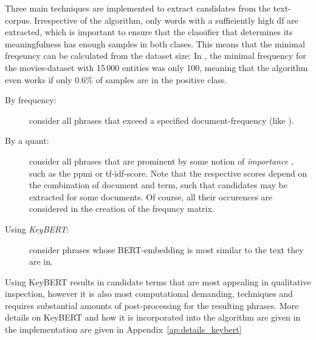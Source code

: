 Three main techniques are implemented to extract candidates from the text-corpus. Irrespective of the algorithm, only words with a sufficiently high \gls{df} are extracted, which is important to ensure that the classifier that determines its meaningfulness has enough samples in both clases. This means that the minimal freqeuncy can be calculated from the dataset size: In \cite{Derrac2015}, the minimal frequency for the movies-dataset with 15\,000 entities was only 100, meaning that the algorithm even works if only 0.6\% of samples are in the positive class. 


\begin{description}
	\item[By frequency:] consider all phrases that exceed a specified document-frequency (like \cite{Derrac2015}).
	\item[By a \gls{quant}:] consider all phrases that are prominent by some notion of \textit{importance} , such as the \gls{ppmi} or \gls{tf-idf}-score. Note that the respective scores depend on the combination of document and term, such that candidates may be extracted for some documents. Of course, all their occurences are considered in the creation of the frequncy matrix.
	\item[Using \emph{KeyBERT}\cite{grootendorst2020keybert}:] consider phrases whose BERT-embedding \cite{Devlin2019} is most similar to the text they are in. 
\end{description}

Using KeyBERT results in candidate terms that are most appealing in qualitative inspection, however it is also most computational demanding, techniques and requires substantial amounts of post-processing for the resulting phrases. More details on KeyBERT and how it is incorporated into the algorithm are given in the implementation are given in Appendix~\ref{ap:details_keybert}


